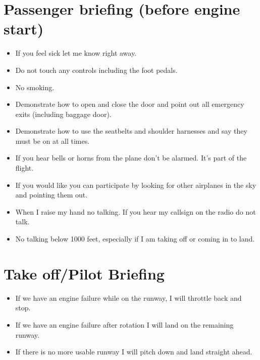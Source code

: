 \documentclass[article,9pt,landscape]{memoir}
\begin{document}
\begin{multicols*}{4}
  \chapter{Passenger briefing (before engine start)}

  \begin{itemize}
    \item If you feel sick let me know right away.

    \item Do not touch any controls including the foot pedals.

    \item No smoking.

    \item Demonstrate how to open and close the door and point out all
      emergency exits (including baggage door).

    \item Demonstrate how to use the seatbelts and shoulder harnesses
      and say they must be on at all times.

    \item If you hear bells or horns from the plane don't be
      alarmed. It's part of the flight.

    \item If you would like you can participate by looking for other
      airplanes in the sky and pointing them out.

    \item When I raise my hand no talking. If you hear my callsign on
      the radio do not talk.

    \item No talking below 1000 feet, especially if I am taking off or
      coming in to land.
  \end{itemize}

  \chapter{Take off/Pilot Briefing}

  \begin{itemize}
    \item If we have an engine failure while on the runway, I will
      throttle back and stop.
  
    \item If we have an engine failure after rotation I will land on
      the remaining runway.

    \item If there is no more usable runway I will pitch down and land
      straight ahead.
  \end{itemize}

  

\end{multicols*}
\end{document}
